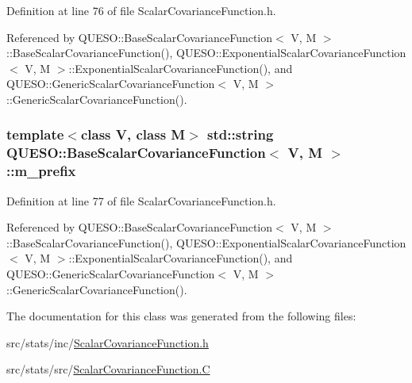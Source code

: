 Definition at line 76 of file Scalar\-Covariance\-Function.\-h.



Referenced by Q\-U\-E\-S\-O\-::\-Base\-Scalar\-Covariance\-Function$<$ V, M $>$\-::\-Base\-Scalar\-Covariance\-Function(), Q\-U\-E\-S\-O\-::\-Exponential\-Scalar\-Covariance\-Function$<$ V, M $>$\-::\-Exponential\-Scalar\-Covariance\-Function(), and Q\-U\-E\-S\-O\-::\-Generic\-Scalar\-Covariance\-Function$<$ V, M $>$\-::\-Generic\-Scalar\-Covariance\-Function().

\hypertarget{class_q_u_e_s_o_1_1_base_scalar_covariance_function_a21636873436b88cb77075c6edbd61c71}{
\subsubsection[{m\-\_\-prefix}]{\setlength{\rightskip}{0pt plus 5cm}template$<$class V, class M$>$ std\-::string {\bf Q\-U\-E\-S\-O\-::\-Base\-Scalar\-Covariance\-Function}$<$ V, M $>$\-::m\-\_\-prefix\hspace{0.3cm}{\ttfamily [protected]}}}\label{class_q_u_e_s_o_1_1_base_scalar_covariance_function_a21636873436b88cb77075c6edbd61c71}


Definition at line 77 of file Scalar\-Covariance\-Function.\-h.



Referenced by Q\-U\-E\-S\-O\-::\-Base\-Scalar\-Covariance\-Function$<$ V, M $>$\-::\-Base\-Scalar\-Covariance\-Function(), Q\-U\-E\-S\-O\-::\-Exponential\-Scalar\-Covariance\-Function$<$ V, M $>$\-::\-Exponential\-Scalar\-Covariance\-Function(), and Q\-U\-E\-S\-O\-::\-Generic\-Scalar\-Covariance\-Function$<$ V, M $>$\-::\-Generic\-Scalar\-Covariance\-Function().



The documentation for this class was generated from the following files\-:\begin{DoxyCompactItemize}
\item 
src/stats/inc/\hyperlink{_scalar_covariance_function_8h}{Scalar\-Covariance\-Function.\-h}\item 
src/stats/src/\hyperlink{_scalar_covariance_function_8_c}{Scalar\-Covariance\-Function.\-C}\end{DoxyCompactItemize}
